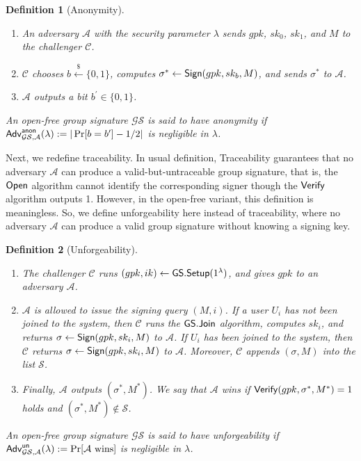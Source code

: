 \documentclass[preprint]{sig-alternate}
\newtheorem{definition}{Definition}[section]
\begin{document}
\begin{definition}[Anonymity]~
\begin{enumerate}
\setlength{\itemsep}{0em}\setlength{\parsep}{0em}
\item An adversary $\mathcal{A}$ with the security parameter $\lambda$ sends $gpk$, $sk_0$, $sk_1$, and $M$ to the challenger $\mathcal{C}$. 
\item $\mathcal{C}$ chooses $b\stackrel{\$}{\leftarrow}\{0,1\}$, 
computes $\sigma^\ast\leftarrow {\sf Sign}(gpk,sk_b,M)$, and sends $\sigma^\ast$ to $\mathcal{A}$. 
\item $\mathcal{A}$ outputs a bit $b^\prime\in\{0,1\}$. 
\end{enumerate}

\noindent 
An open-free group signature $\mathcal{GS}$ is said to have anonymity if ${\sf Adv}^{{\sf anon}}_{\mathcal{GS},\mathcal{A}}(\lambda):=|\Pr[b=b^\prime]-1/2|$ is negligible in $\lambda$. 
\end{definition}

Next, we redefine traceability. 
In usual definition, 
Traceability guarantees that no adversary $\mathcal{A}$ can produce a valid-but-untraceable group signature, that is, the ${\sf Open}$ algorithm cannot identify the corresponding signer though the ${\sf Verify}$ algorithm outputs 1. 
However, in the open-free variant, this definition is meaningless.
So, we define unforgeability here instead of traceability, where no adversary $\mathcal{A}$ can produce a valid group signature without knowing a signing key. 

\begin{definition}[Unforgeability]~
\begin{enumerate}
\setlength{\itemsep}{0em}\setlength{\parsep}{0em}
\item The challenger $\mathcal{C}$ runs $(gpk,ik)\leftarrow{\sf GS.Setup}(1^\lambda)$, and gives $gpk$ to an adversary $\mathcal{A}$. 
\item $\mathcal{A}$ is allowed to issue the signing query $(M,i)$. If a user $U_i$ has not been joined to the system, then $\mathcal{C}$ runs the ${\sf GS.Join}$ algorithm, computes $sk_i$, and returns $\sigma\leftarrow {\sf Sign}(gpk,sk_i,M)$ to $\mathcal{A}$. If $U_i$ has been joined to the system, then $\mathcal{C}$ returns $\sigma\leftarrow {\sf Sign}(gpk,sk_i,M)$ to $\mathcal{A}$. Moreover, $\mathcal{C}$ appends $(\sigma,M)$ into the list $\mathcal{S}$. 

\item Finally, $\mathcal{A}$ outputs $(\sigma^\ast,M^\ast)$.
We say that $\mathcal{A}$ wins if ${\sf Verify}(gpk,\sigma^\ast,M^\ast)=1$ holds and $(\sigma^\ast,M^\ast)\not\in\mathcal{S}$. 
\end{enumerate}


\noindent 
An open-free group signature $\mathcal{GS}$ is said to have unforgeability if ${\sf Adv}^{{\sf un}}_{\mathcal{GS},\mathcal{A}}(\lambda):=\Pr[\mathcal{A}~\text{wins}]$ is negligible in $\lambda$. 
\end{definition}
\end{document}
